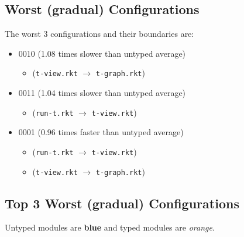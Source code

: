 \documentclass{article}
\newcommand{\mono}[1]{\texttt{#1}}
\begin{document}
\subsection{Worst (gradual) Configurations}
The worst 3 configurations and their boundaries are:
\begin{itemize}
\item 0010 (1.08 times slower than untyped average)
  \begin{itemize}
  \item (\mono{t-view.rkt} $\rightarrow$ \mono{t-graph.rkt})
  \end{itemize}
\item 0011 (1.04 times slower than untyped average)
  \begin{itemize}
  \item (\mono{run-t.rkt} $\rightarrow$ \mono{t-view.rkt})
  \end{itemize}
\item 0001 (0.96 times faster than untyped average)
  \begin{itemize}
  \item (\mono{run-t.rkt} $\rightarrow$ \mono{t-view.rkt})
  \item (\mono{t-view.rkt} $\rightarrow$ \mono{t-graph.rkt})
  \end{itemize}
\end{itemize}

\subsection{Top 3 Worst (gradual) Configurations}
Untyped modules are \textbf{blue} and typed modules are \emph{orange}.
\end{document}

